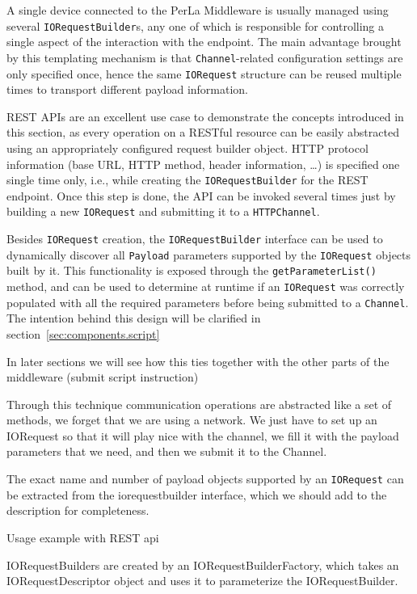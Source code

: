 A single device connected to the PerLa Middleware is usually managed using several \texttt{IORequestBuilder}s, any one of which is responsible for controlling a single aspect of the interaction with the endpoint. The main advantage brought by this templating mechanism is that \texttt{Channel}-related configuration settings are only specified once, hence the same \texttt{IORequest} structure can be reused multiple times to transport different payload information.

REST APIs are an excellent use case to demonstrate the concepts introduced in this section, as every operation on a RESTful resource can be easily abstracted using an appropriately configured request builder object. HTTP protocol information (base URL, HTTP method, header information, \ldots) is specified one single time only, i.e., while creating the \texttt{IORequestBuilder} for the REST endpoint. Once this step is done, the API can be invoked several times just by building a new \texttt{IORequest} and submitting it to a \texttt{HTTPChannel}.

Besides \texttt{IORequest} creation, the \texttt{IORequestBuilder} interface can be used to dynamically discover all \texttt{Payload} parameters supported by the \texttt{IORequest} objects built by it. This functionality is exposed through the \texttt{getParameterList()} method, and can be used to determine at runtime if an \texttt{IORequest} was correctly populated with all the required parameters before being submitted to a \texttt{Channel}. The intention behind this design will be clarified in section~\ref{sec:components.script}

In later sections we will see how this ties together with the other parts of the middleware (submit script instruction)


Through this technique communication operations are abstracted like a set of methods, we forget that we are using a network. We just have to set up an IORequest so that it will play nice with the channel, we fill it with the payload parameters that we need, and then we submit it to the Channel.

The exact name and number of payload objects supported by an \texttt{IORequest} can be extracted from the iorequestbuilder interface, which we should add to the description for completeness.


Usage example with REST api


IORequestBuilders are created by an IORequestBuilderFactory, which takes an IORequestDescriptor object and uses it to parameterize the IORequestBuilder.





